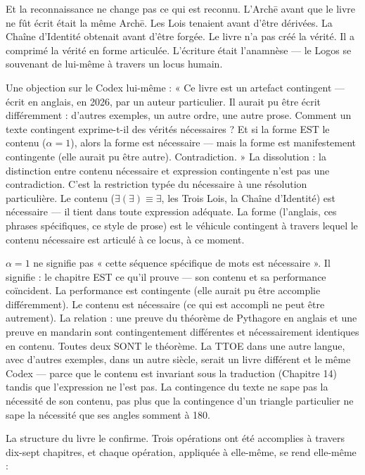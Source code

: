 \documentclass[10pt, openany, oneside]{book}
\begin{document}
Et la reconnaissance ne change pas ce qui est reconnu. L'Arch\={e} avant que le livre ne fût écrit était la même Arch\={e}. Les Lois tenaient avant d'être dérivées. La Chaîne d'Identité obtenait avant d'être forgée. Le livre n'a pas créé la vérité. Il a comprimé la vérité en forme articulée. L'écriture était l'anamnèse --- le Logos se souvenant de lui-même à travers un locus humain.

Une objection sur le Codex lui-même : « Ce livre est un artefact contingent --- écrit en anglais, en 2026, par un auteur particulier. Il aurait pu être écrit différemment : d'autres exemples, un autre ordre, une autre prose. Comment un texte contingent exprime-t-il des vérités nécessaires ? Et si la forme EST le contenu ($\alpha = 1$), alors la forme est nécessaire --- mais la forme est manifestement contingente (elle aurait pu être autre). Contradiction. » La dissolution : la distinction entre contenu nécessaire et expression contingente n'est pas une contradiction. C'est la restriction typée du nécessaire à une résolution particulière. Le contenu ($\exists(\exists) \equiv \exists$, les Trois Lois, la Chaîne d'Identité) est nécessaire --- il tient dans toute expression adéquate. La forme (l'anglais, ces phrases spécifiques, ce style de prose) est le véhicule contingent à travers lequel le contenu nécessaire est articulé à ce locus, à ce moment.

$\alpha = 1$ ne signifie pas « cette séquence spécifique de mots est nécessaire ». Il signifie : le chapitre EST ce qu'il prouve --- son contenu et sa performance coïncident. La performance est contingente (elle aurait pu être accomplie différemment). Le contenu est nécessaire (ce qui est accompli ne peut être autrement). La relation : une preuve du théorème de Pythagore en anglais et une preuve en mandarin sont contingentement différentes et nécessairement identiques en contenu. Toutes deux SONT le théorème. La TTOE dans une autre langue, avec d'autres exemples, dans un autre siècle, serait un livre différent et le même Codex --- parce que le contenu est invariant sous la traduction (Chapitre 14) tandis que l'expression ne l'est pas. La contingence du texte ne sape pas la nécessité de son contenu, pas plus que la contingence d'un triangle particulier ne sape la nécessité que ses angles somment à 180\textdegree.

La structure du livre le confirme. Trois opérations ont été accomplies à travers dix-sept chapitres, et chaque opération, appliquée à elle-même, se rend elle-même :
\end{document}
